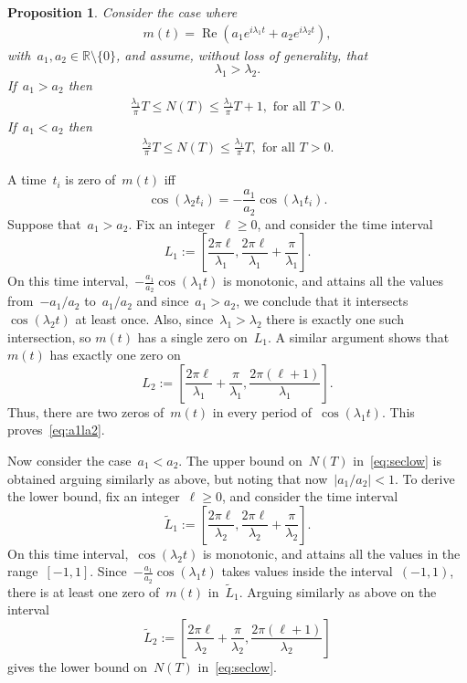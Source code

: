 \documentclass[final ]{IEEEtran}
\newcommand{\real}{\operatorname{Re}}
\newtheorem{proposition}{Proposition}%
\newcommand {\R}{\mathbb R}
\begin{document}
\begin{proposition}\label{prop:two_oscillators}
   Consider the case where
    \begin{align*} 
       m(t)=\real(a_1e^{i\lambda_1 t}+a_2e^{i\lambda_2 t}), 
    \end{align*}
    with~$a_1,a_2\in\R\setminus\{0\}$,
  and  assume, without loss of generality, that
    \[
    \lambda_1>\lambda_2.
    \]
  If~$a_1>a_2$ then
     \begin{align} \label{eq:a1la2}
        \frac{\lambda_1}{\pi}T\leq N(T)\leq\frac{\lambda_1}{\pi}T+1,\text{ for all }T>0.
    \end{align}
If~$a_1<a_2$ then 
 \begin{align} \label{eq:seclow}
        \frac{\lambda_2}{\pi}T\leq N(T)\leq\frac{\lambda_1}{\pi}T,\text{ for all }T>0.
    \end{align}
    \end{proposition}
    \begin{IEEEproof}
A time~$t_i$ is zero of~$m(t)$ iff
\[
 \cos(\lambda_2 t_i) =-\frac{a_1}{a_2} \cos(\lambda_1 t_i).
\]
Suppose that~$a_1>a_2$. 
Fix an integer~$\ell\geq 0$, and consider the time interval
\[
L_1:=[\frac{2\pi\ell}{\lambda_1},  \frac{2\pi\ell}{\lambda_1}+\frac{\pi}{\lambda_1}].
\]
On this time interval,~$-\frac{a_1}{a_2}\cos(\lambda_1 t)$ is monotonic, and attains all the values from~$-a_1/a_2$ to~$a_1/ a_2$ and since~$a_1>a_2$, we conclude that it intersects~$\cos(\lambda_2t)$ at least once. Also, since~$\lambda_1>\lambda_2$ there is exactly one such intersection, so $m(t)$ has   a single  zero on~$L_1$. A similar argument shows that~$m(t)$ has exactly one zero on 
\[
L_2:=[   \frac{2\pi\ell}{\lambda_1}+\frac{\pi}{\lambda_1}, \frac{2\pi(\ell+1)}{\lambda_1}  ].
\]
Thus, there are two zeros of~$m(t)$ in  every period of~$   \cos(\lambda_1 t)$. This proves~\eqref{eq:a1la2}.

Now consider the case~$a_1<a_2$.  The upper bound on~$N(T)$ in~\eqref{eq:seclow} is obtained arguing similarly as above, but noting that now~$|a_1/a_2|<1$. 
To derive the lower  bound, 
fix an integer~$\ell\geq 0$, and consider the time interval
\[
\tilde L_1:=[\frac{2\pi\ell}{\lambda_2},  \frac{2\pi\ell}{\lambda_2}+\frac{\pi}{\lambda_2}].
\]
On this time interval,~$ \cos(\lambda_2 t)$ is monotonic, and attains all the values in the range~$[-1,1] $.  Since~$-\frac{a_1}{a_2}\cos(\lambda_1t)$ takes values inside the interval~$(-1,1)$, there is at least one zero of~$m(t)$ in~$\tilde L_1$.  Arguing similarly as above on the interval
\[
\tilde L_2:=[  \frac{2\pi\ell}{\lambda_2}+\frac{\pi}{\lambda_2},
\frac{2\pi(\ell+1)}{\lambda_2}  ] 
\]
gives the lower bound on~$N(T)$ in~\eqref{eq:seclow}. 
    \end{IEEEproof} 
\end{document}
